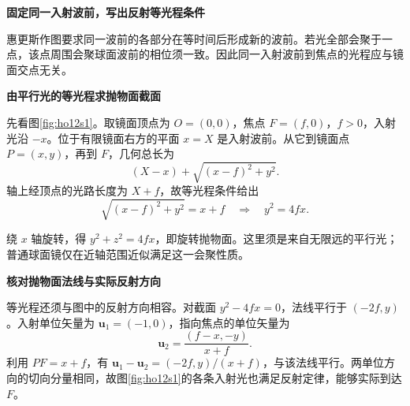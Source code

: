 \begin{solution}\textbf{固定同一入射波前，写出反射等光程条件}\par\nobreak
惠更斯作图要求同一波前的各部分在等时间后形成新的波前。若光全部会聚于一点，该点周围会聚球面波前的相位须一致。因此同一入射波前到焦点的光程应与镜面交点无关。



\par\medskip{}\noindent\textbf{由平行光的等光程求抛物面截面}\par\nobreak
先看图\ref{fig:ho12s1}。取镜面顶点为 $O=(0,0)$，焦点 $F=(f,0)$，$f>0$，入射光沿 $-x$。位于有限镜面右方的平面 $x=X$ 是入射波前。从它到镜面点 $P=(x,y)$，再到 $F$，几何总长为
\[
(X-x)+\sqrt{(x-f)^2+y^2}.
\]
轴上经顶点的光路长度为 $X+f$，故等光程条件给出
\[
\sqrt{(x-f)^2+y^2}=x+f
\quad\Longrightarrow\quad \boxed{y^2=4fx}.
\]

绕 $x$ 轴旋转，得 $y^2+z^2=4fx$，即旋转抛物面。这里须是来自无限远的平行光；普通球面镜仅在近轴范围近似满足这一会聚性质。



\par\medskip{}\noindent\textbf{核对抛物面法线与实际反射方向}\par\nobreak
等光程还须与图中的反射方向相容。对截面 $y^2-4fx=0$，法线平行于 $(-2f,y)$。入射单位矢量为 $\bm u_1=(-1,0)$，指向焦点的单位矢量为
\[
\bm u_2=\frac{(f-x,-y)}{x+f}.
\]
利用 $PF=x+f$，有 $\bm u_1-\bm u_2=(-2f,y)/(x+f)$，与该法线平行。两单位方向的切向分量相同，故图\ref{fig:ho12s1}的各条入射光也满足反射定律，能够实际到达 $F$。




\end{solution}
